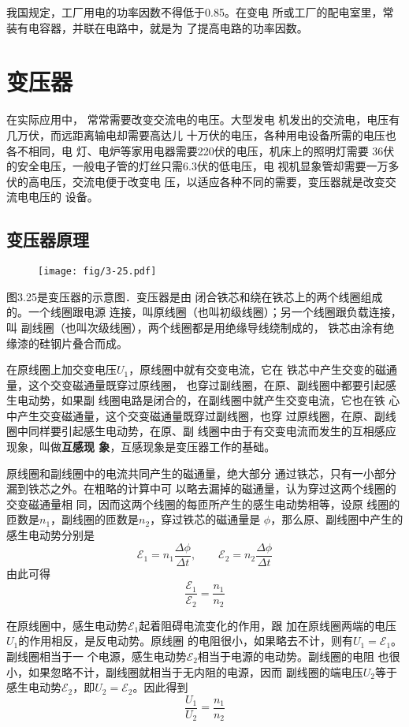 我国规定，工厂用电的功率因数不得低于0.85。在变电
所或工厂的配电室里，常装有电容器，并联在电路中，就是为
了提高电路的功率因数。

\section{变压器}
在实际应用中，
常常需要改变交流电的电压。大型发电
机发出的交流电，电压有几万伏，而远距离输电却需要高达儿
十万伏的电压，各种用电设备所需的电压也各不相同，电
灯、电炉等家用电器需要220伏的电压，机床上的照明灯需要
36伏的安全电压，一般电子管的灯丝只需6.3伏的低电压，电
视机显象管却需要一万多伏的高电压，交流电便于改变电
压，以适应各种不同的需要，变压器就是改变交流电电压的
设备。

\subsection{变压器原理}
\begin{figure}[htp]\centering
    \texttt{[image: fig/3-25.pdf]}
    \caption{}
    \end{figure}

图3.25是变压器的示意图．变压器是由
闭合铁芯和绕在铁芯上的两个线圈组成的。一个线圈跟电源
连接，叫原线圈（也叫初级线圈）；另一个线圈跟负载连接，叫
副线圈（也叫次级线圈），两个线圈都是用绝缘导线绕制成的，
铁芯由涂有绝缘漆的硅钢片叠合而成。


在原线圈上加交变电压$U_1$，原线圈中就有交变电流，它在
铁芯中产生交变的磁通量，这个交变磁通量既穿过原线圈，
也穿过副线圈，在原、副线圈中都要引起感生电动势，如果副
线圈电路是闭合的，在副线圈中就产生交变电流，它也在铁
心中产生交变磁通量，这个交变磁通量既穿过副线圈，也穿
过原线圈，在原、副线圈中同样要引起感生电动势，在原、副
线圈中由于有交变电流而发生的互相感应现象，叫做\textbf{互感现
象}，互感现象是变压器工作的基础。

原线圈和副线圈中的电流共同产生的磁通量，绝大部分
通过铁芯，只有一小部分漏到铁芯之外。在粗略的计算中可
以略去漏掉的磁通量，认为穿过这两个线圈的交变磁通量相
同，因而这两个线圈的每匝所产生的感生电动势相等，设原
线圈的匝数是$n_1$，副线圈的匝数是$n_2$，穿过铁芯的磁通量是
$\phi$，那么原、副线圈中产生的感生电动势分别是
\[\mathcal{E}_1=n_1\frac{\Delta \phi}{\Delta t},\qquad  \mathcal{E}_2=n_2\frac{\Delta \phi}{\Delta t}\]
由此可得
\begin{equation}
    \frac{\mathcal{E}_1}{\mathcal{E}_2}=\frac{n_1}{n_2} 
\end{equation}

在原线圈中，感生电动势$\mathcal{E}_1$起着阻碍电流变化的作用，跟
加在原线圈两端的电压$U_1$的作用相反，是反电动势。原线圈
的电阻很小，如果略去不计，则有$U_1=\mathcal{E}_1$。副线圈相当于一
个电源，感生电动势$\mathcal{E}_2$相当于电源的电动势。副线圈的电阻
也很小，如果忽略不计，副线圈就相当于无内阻的电源，因而
副线圈的端电压$U_2$等于感生电动势$\mathcal{E}_2$，即$U_2=\mathcal{E}_2$。因此得到
\begin{equation}
    \frac{U_1}{U_2}=\frac{n_1}{n_2} 
\end{equation}

